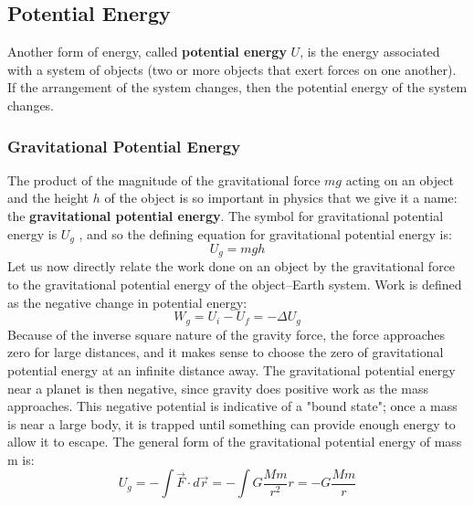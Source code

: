 \documentclass{article}
\begin{document}
	\subsection{Potential Energy}
    	Another form of energy, called \textbf{potential energy} $U$, is the energy associated with a system of objects (two or more objects that exert forces on one another). If the arrangement of the system changes, then the potential energy of the system changes.
        \subsubsection{Gravitational Potential Energy}
        	The product of the magnitude of the gravitational force $mg$ acting on an object and the height $h$ of the object is so important in physics that we give it a name: the \textbf{gravitational potential energy}. The symbol for gravitational potential energy is $U_g$ , and so the defining equation for gravitational potential energy is:
            \[
            	U_g=mgh
            \]
            Let us now directly relate the work done on an object by the gravitational force to the gravitational potential energy of the object–Earth system. Work is defined as the negative change in potential energy:
            \[
            	W_g=U_i-U_f=-\Delta U_g
            \]
            Because of the inverse square nature of the gravity force, the force approaches zero for large distances, and it makes sense to choose the zero of gravitational potential energy at an infinite distance away. The gravitational potential energy near a planet is then negative, since gravity does positive work as the mass approaches. This negative potential is indicative of a "bound state"; once a mass is near a large body, it is trapped until something can provide enough energy to allow it to escape. The general form of the gravitational potential energy of mass m is:
            \[
            	U_g=-\int \vec{F}\cdot d\vec{r}=-\int G\frac{Mm}{r^2}r=-G\frac{Mm}{r}
            \]
\end{document}
